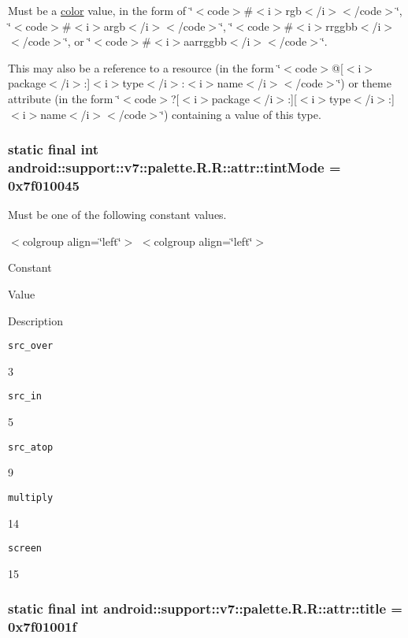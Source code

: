 Must be a \hyperlink{classandroid_1_1support_1_1v7_1_1palette_1_1_r_1_1color}{color} value, in the form of \char`\"{}$<$code$>$\#$<$i$>$rgb$<$/i$>$$<$/code$>$\char`\"{}, \char`\"{}$<$code$>$\#$<$i$>$argb$<$/i$>$$<$/code$>$\char`\"{}, \char`\"{}$<$code$>$\#$<$i$>$rrggbb$<$/i$>$$<$/code$>$\char`\"{}, or \char`\"{}$<$code$>$\#$<$i$>$aarrggbb$<$/i$>$$<$/code$>$\char`\"{}. 

This may also be a reference to a resource (in the form \char`\"{}$<$code$>$@\mbox{[}$<$i$>$package$<$/i$>$:\mbox{]}$<$i$>$type$<$/i$>$:$<$i$>$name$<$/i$>$$<$/code$>$\char`\"{}) or theme attribute (in the form \char`\"{}$<$code$>$?\mbox{[}$<$i$>$package$<$/i$>$:\mbox{]}\mbox{[}$<$i$>$type$<$/i$>$:\mbox{]}$<$i$>$name$<$/i$>$$<$/code$>$\char`\"{}) containing a value of this type. \hypertarget{classandroid_1_1support_1_1v7_1_1palette_1_1_r_1_1attr_586358132d33c48b901e981806aced73}{
\subsubsection[{tintMode}]{\setlength{\rightskip}{0pt plus 5cm}static final int android::support::v7::palette.R.R::attr::tintMode = 0x7f010045}}
\label{classandroid_1_1support_1_1v7_1_1palette_1_1_r_1_1attr_586358132d33c48b901e981806aced73}


Must be one of the following constant values. \begin{TabularC}{0}
\hline
\end{TabularC}
$<$colgroup align=\char`\"{}left\char`\"{}$>$ $<$colgroup align=\char`\"{}left\char`\"{}$>$ 

Constant

Value

Description 

{\tt src\_\-over}

3

{\tt src\_\-in}

5

{\tt src\_\-atop}

9

{\tt multiply}

14

{\tt screen}

15\hypertarget{classandroid_1_1support_1_1v7_1_1palette_1_1_r_1_1attr_e03514d819a921a90e18c93f1de75959}{
\subsubsection[{title}]{\setlength{\rightskip}{0pt plus 5cm}static final int android::support::v7::palette.R.R::attr::title = 0x7f01001f}}
\label{classandroid_1_1support_1_1v7_1_1palette_1_1_r_1_1attr_e03514d819a921a90e18c93f1de75959}


